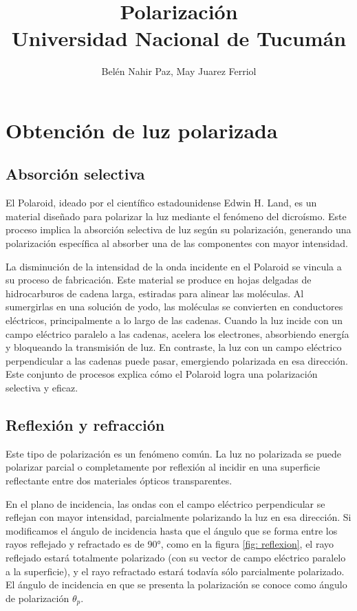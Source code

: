 \documentclass[a4paper,12pt]{article}
\title{ Polarización \\ 
\medskip \large Universidad Nacional de Tucumán}
\author{Belén Nahir Paz, May Juarez Ferriol}
\date{}
\begin{document}
\maketitle

\section*{Obtención de luz polarizada}

    \subsection*{Absorción selectiva}

        El Polaroid, ideado por el científico estadounidense Edwin H. Land, es un material diseñado para polarizar la luz mediante el fenómeno del dicroísmo. Este proceso implica la absorción selectiva de luz según su polarización, generando una polarización específica al absorber una de las componentes con mayor intensidad.

        La disminución de la intensidad de la onda incidente en el Polaroid se vincula a su proceso de fabricación. Este material se produce en hojas delgadas de hidrocarburos de cadena larga, estiradas para alinear las moléculas. Al sumergirlas en una solución de yodo, las moléculas se convierten en conductores eléctricos, principalmente a lo largo de las cadenas. Cuando la luz incide con un campo eléctrico paralelo a las cadenas, acelera los electrones, absorbiendo energía y bloqueando la transmisión de luz. En contraste, la luz con un campo eléctrico perpendicular a las cadenas puede pasar, emergiendo polarizada en esa dirección. Este conjunto de procesos explica cómo el Polaroid logra una polarización selectiva y eficaz.

    \subsection*{Reflexión y refracción}

        Este tipo de polarización es un fenómeno común. La luz no polarizada se puede polarizar parcial o completamente por reflexión al incidir en una superficie reflectante entre dos materiales ópticos transparentes. 
        
        En el plano de incidencia, las ondas con el campo eléctrico perpendicular se reflejan con mayor intensidad, parcialmente polarizando la luz en esa dirección. Si modificamos el ángulo de incidencia hasta que el ángulo que se forma entre los rayos reflejado y refractado es de 90°, como en la figura \ref{fig: reflexion}, el rayo reflejado estará totalmente polarizado (con su vector de campo eléctrico paralelo a la superficie), y el rayo refractado estará todavía sólo parcialmente polarizado. El ángulo de incidencia en que se presenta la polarización se conoce como ángulo de polarización $\theta_p$.
\end{document}
